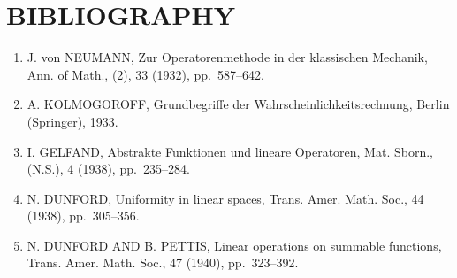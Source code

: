 \chapter*{BIBLIOGRAPHY}
{}

\begin{enumerate}
\def\labelenumi{(\Roman{enumi})}
\item
  J. von NEUMANN, Zur Operatorenmethode in der klassischen Mechanik, Ann. of Math., (2), 33 (1932), pp.~587--642.
\item
  A. KOLMOGOROFF, Grundbegriffe der Wahrscheinlichkeitsrechnung, Berlin (Springer), 1933.
\item
  I. GELFAND, Abstrakte Funktionen und lineare Operatoren, Mat. Sborn., (N.S.), 4 (1938), pp.~235--284.
\item
  N. DUNFORD, Uniformity in linear spaces, Trans. Amer. Math. Soc., 44 (1938), pp.~305--356.
\item
  N. DUNFORD AND B. PETTIS, Linear operations on summable functions, Trans. Amer. Math. Soc., 47 (1940), pp.~323--392.
\end{enumerate}

